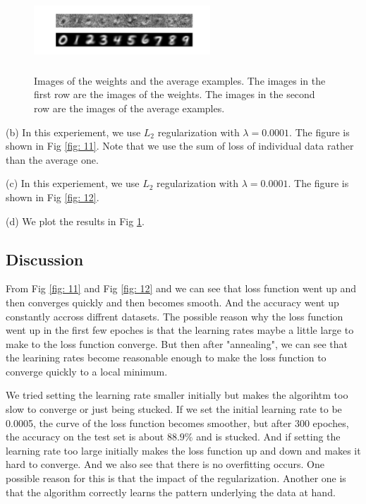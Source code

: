 \documentclass{article} %
\begin{document}
\begin{figure}[t]
	\centering	
	\includegraphics[width=2.6in,height=1.2in]{../softmax/figs/image_of_weights_and_digits.png} 
	\caption{Images of the weights and the average examples. The images in the first row are the images of the weights. The images in the second row are the images of the average examples.}
	\label{fig: 13}
\end{figure}

(b) In this experiement, we use $L_2$ regularization with $\lambda = 0.0001$. The figure is shown in Fig \ref{fig: 11}. Note that we use the sum of loss of individual data rather than the average one.


(c) In this experiement, we use $L_2$ regularization with $\lambda = 0.0001$. The figure is shown in Fig \ref{fig: 12}.

(d) We plot the results in Fig \ref{fig: 13}.


\subsection{Discussion}
From Fig \ref{fig: 11} and Fig \ref{fig: 12} and we can see that loss function went up and then  converges quickly and then becomes smooth. And the accuracy went up constantly accross diffrent datasets. The possible reason why the loss function went up in the first few epoches is that the learning rates maybe a little large to make to the loss function converge. But then after "annealing", we can see that the learining rates become reasonable enough to make the loss function to converge quickly to a local minimum. 

We tried setting the learning rate smaller initially but makes the algorihtm too slow to converge or just being stucked. If we set the initial learning rate to be 0.0005, the curve of the loss function becomes smoother, but after 300 epoches, the accuracy on the test set is about $88.9\%$ and is stucked. And if setting the learning rate too large initially makes the loss function up and down and makes it hard to converge. And we also see that there is no overfitting occurs. One possible reason for this is that the impact of the regularization. Another one is that the algorithm correctly learns the pattern underlying the data at hand.
\end{document}
